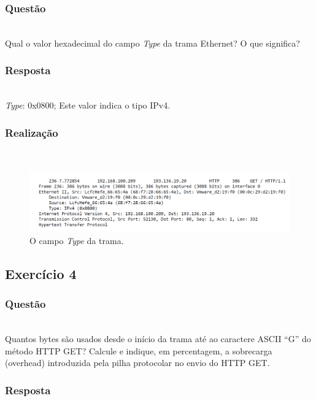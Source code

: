 \documentclass{llncs}
\begin{document}
\subsubsection{Questão}\rule[-10pt]{0pt}{10pt}\\

Qual o valor hexadecimal do campo \textit{Type} da trama Ethernet? O que significa?

\subsubsection{Resposta}\rule[-10pt]{0pt}{10pt}\\

\textit{Type}: 0x0800; Este valor indica o tipo IPv4.

\subsubsection{Realização}\rule[-10pt]{0pt}{10pt}\\

\begin{figure}
  \begin{center}
  \includegraphics[scale=0.35]{imagens/MACAddrGET.png} 
  \end{center}
  \caption{O campo \textit{Type} da trama.}
  \label{fig:frame_field}
\end{figure} 

\clearpage
\subsection{Exercício 4}
\subsubsection{Questão}\rule[-10pt]{0pt}{10pt}\\

Quantos bytes são usados desde o início da trama até ao caractere ASCII “G” do método HTTP GET? Calcule e indique, em percentagem, a sobrecarga (overhead) introduzida pela pilha protocolar no envio do HTTP GET.

\subsubsection{Resposta}\rule[-10pt]{0pt}{10pt}\\
\end{document}
